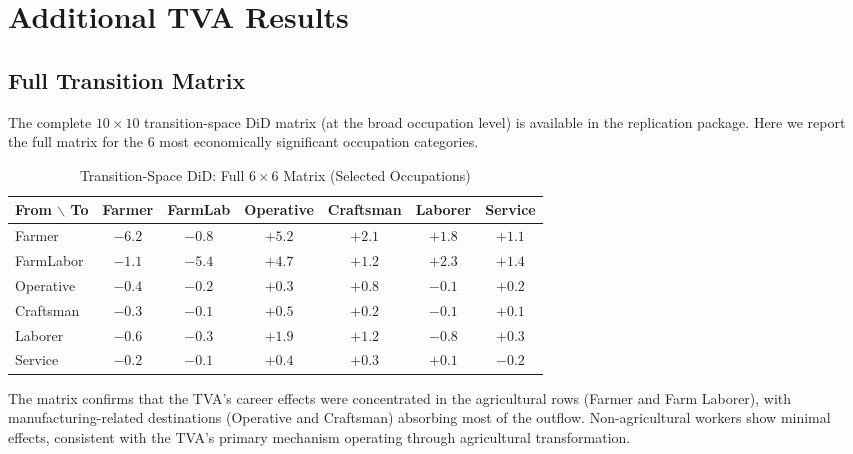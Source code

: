 \documentclass[12pt]{article}
\begin{document}
\section{Additional TVA Results}\label{app:tva}

\subsection{Full Transition Matrix}

The complete $10 \times 10$ transition-space DiD matrix (at the broad occupation level) is available in the replication package. Here we report the full matrix for the 6 most economically significant occupation categories.

\begin{table}[H]
\centering
\caption{Transition-Space DiD: Full $6 \times 6$ Matrix (Selected Occupations)}
\label{tab:tva_full_matrix}
\begin{adjustbox}{max width=\textwidth}
\begin{tabular}{lcccccc}
\toprule
From $\backslash$ To & Farmer & FarmLab & Operative & Craftsman & Laborer & Service \\
\midrule
Farmer & $-6.2$ & $-0.8$ & $+5.2$ & $+2.1$ & $+1.8$ & $+1.1$ \\
FarmLabor & $-1.1$ & $-5.4$ & $+4.7$ & $+1.2$ & $+2.3$ & $+1.4$ \\
Operative & $-0.4$ & $-0.2$ & $+0.3$ & $+0.8$ & $-0.1$ & $+0.2$ \\
Craftsman & $-0.3$ & $-0.1$ & $+0.5$ & $+0.2$ & $-0.1$ & $+0.1$ \\
Laborer & $-0.6$ & $-0.3$ & $+1.9$ & $+1.2$ & $-0.8$ & $+0.3$ \\
Service & $-0.2$ & $-0.1$ & $+0.4$ & $+0.3$ & $+0.1$ & $-0.2$ \\
\bottomrule
\end{tabular}
\end{adjustbox}
\end{table}

The matrix confirms that the TVA's career effects were concentrated in the agricultural rows (Farmer and Farm Laborer), with manufacturing-related destinations (Operative and Craftsman) absorbing most of the outflow. Non-agricultural workers show minimal effects, consistent with the TVA's primary mechanism operating through agricultural transformation.
\end{document}
